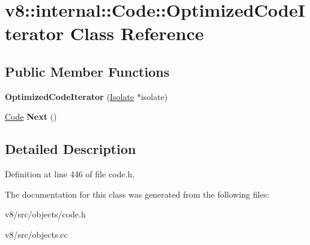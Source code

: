 \hypertarget{classv8_1_1internal_1_1Code_1_1OptimizedCodeIterator}{}\section{v8\+:\+:internal\+:\+:Code\+:\+:Optimized\+Code\+Iterator Class Reference}
\label{classv8_1_1internal_1_1Code_1_1OptimizedCodeIterator}
\subsection*{Public Member Functions}
\begin{DoxyCompactItemize}
\item 
\mbox{\label{classv8_1_1internal_1_1Code_1_1OptimizedCodeIterator_ac4867eec34ea596aa1837501aa7c04ab}} 
{\bfseries Optimized\+Code\+Iterator} (\mbox{\hyperlink{classv8_1_1internal_1_1Isolate}{Isolate}} $\ast$isolate)
\item 
\mbox{\label{classv8_1_1internal_1_1Code_1_1OptimizedCodeIterator_a41b41539f6f06a1c262c4045cb492a9a}} 
\mbox{\hyperlink{classv8_1_1internal_1_1Code}{Code}} {\bfseries Next} ()
\end{DoxyCompactItemize}


\subsection{Detailed Description}


Definition at line 446 of file code.\+h.



The documentation for this class was generated from the following files\+:\begin{DoxyCompactItemize}
\item 
v8/src/objects/code.\+h\item 
v8/src/objects.\+cc\end{DoxyCompactItemize}
